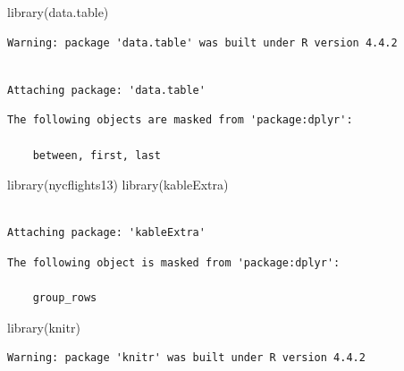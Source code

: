 \documentclass[
  12pt,
]{article}
\newenvironment{Shaded}{\begin{snugshade}}{\end{snugshade}}
\newcommand{\FunctionTok}[1]{\textcolor[rgb]{0.28,0.35,0.67}{#1}}
\newcommand{\NormalTok}[1]{\textcolor[rgb]{0.00,0.23,0.31}{#1}}
\begin{document}
\begin{Shaded}
\begin{Highlighting}[]
\FunctionTok{library}\NormalTok{(data.table)}
\end{Highlighting}
\end{Shaded}

\begin{verbatim}
Warning: package 'data.table' was built under R version 4.4.2
\end{verbatim}

\begin{verbatim}

Attaching package: 'data.table'
\end{verbatim}

\begin{verbatim}
The following objects are masked from 'package:dplyr':

    between, first, last
\end{verbatim}

\begin{Shaded}
\begin{Highlighting}[]
\FunctionTok{library}\NormalTok{(nycflights13)}
\FunctionTok{library}\NormalTok{(kableExtra)}
\end{Highlighting}
\end{Shaded}

\begin{verbatim}

Attaching package: 'kableExtra'
\end{verbatim}

\begin{verbatim}
The following object is masked from 'package:dplyr':

    group_rows
\end{verbatim}

\begin{Shaded}
\begin{Highlighting}[]
\FunctionTok{library}\NormalTok{(knitr)}
\end{Highlighting}
\end{Shaded}

\begin{verbatim}
Warning: package 'knitr' was built under R version 4.4.2
\end{verbatim}
\end{document}
